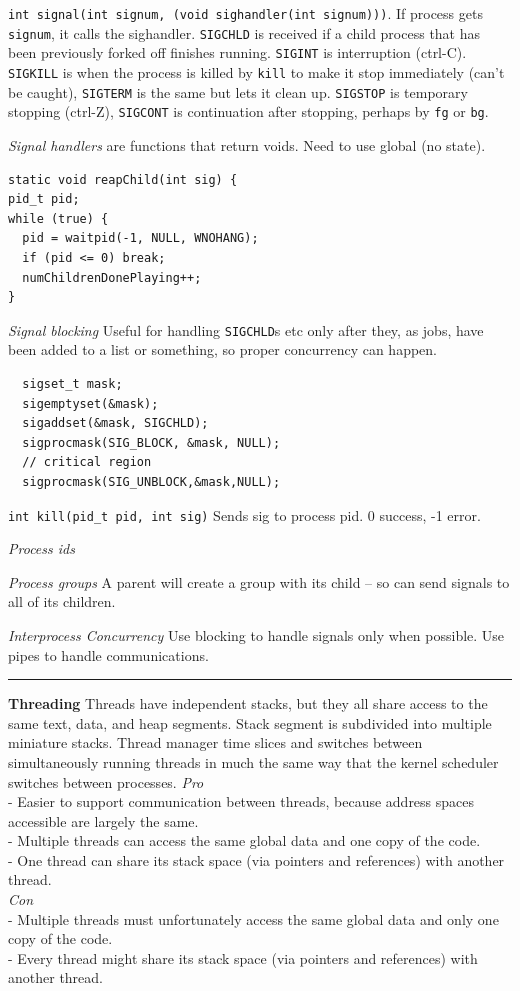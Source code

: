 \documentclass{article}
\begin{document}
\begin{multicols}{2}
  {\tt int signal(int signum, (void sighandler(int signum)))}. If process gets
  {\tt signum}, it calls the sighandler. \texttt{SIGCHLD} is received if a child
  process that has been previously forked off finishes running. \texttt{SIGINT}
  is interruption (ctrl-C). \texttt{SIGKILL} is when the process is killed by
  \texttt{kill} to make it stop immediately (can't be caught), \texttt{SIGTERM}
  is the same but lets it clean up. \texttt{SIGSTOP} is temporary stopping
  (ctrl-Z), \texttt{SIGCONT} is continuation after stopping, perhaps by
  \texttt{fg} or \texttt{bg}.

  {\it Signal handlers} are functions that return voids. Need to use global (no
  state).
  \begin{verbatim}
static void reapChild(int sig) {
pid_t pid;
while (true) {
  pid = waitpid(-1, NULL, WNOHANG);
  if (pid <= 0) break;
  numChildrenDonePlaying++;
} \end{verbatim}
  {\it Signal blocking} Useful for handling \texttt{SIGCHLD}s etc only after they, as
  jobs, have been added to a list or something, so proper concurrency can
  happen.
  \begin{verbatim}
  sigset_t mask;
  sigemptyset(&mask);
  sigaddset(&mask, SIGCHLD);
  sigprocmask(SIG_BLOCK, &mask, NULL);
  // critical region
  sigprocmask(SIG_UNBLOCK,&mask,NULL);\end{verbatim}

  {\tt int kill(pid\_t pid, int sig)} Sends sig to process pid. 0 success, -1
  error.

  {\it Process ids} %

  {\it Process groups} A parent will create a group with its child -- so can
  send signals to all of its children.

  {\it Interprocess Concurrency} Use blocking to handle signals only when
  possible. Use pipes to handle communications.

  \noindent\rule{4cm}{0.4pt}

  {\bf Threading}
  Threads have independent stacks, but they all share access to the same text,
  data, and heap segments. Stack segment is subdivided into multiple miniature
  stacks. Thread manager time slices and switches between simultaneously running
  threads in much the same way that the kernel scheduler switches between
  processes.
  {\it Pro}\\
  - Easier to support communication between threads, because address spaces
  accessible are largely the same.\\
  - Multiple threads can access the same global data and one copy of the code.\\
  - One thread can share its stack space (via pointers and references) with
  another thread.\\
  {\it Con}\\
  - Multiple threads must unfortunately access the same global data and only one
  copy of the code.\\
  - Every thread might share its stack space (via pointers and references) with
  another thread.


\end{multicols}
\end{document}
